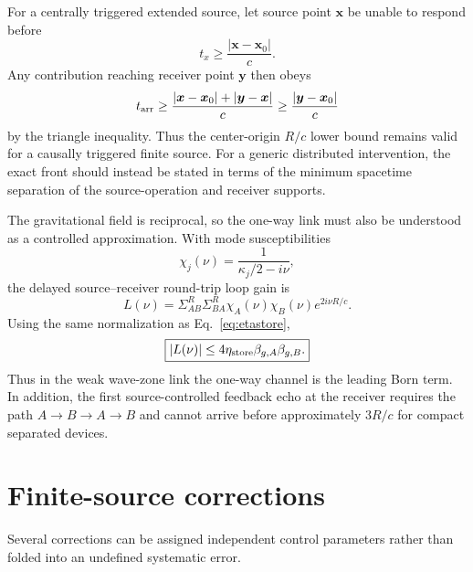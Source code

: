 \documentclass[11pt]{article}
\begin{document}
For a centrally triggered extended source, let source point $\bm x$ be unable to respond before
\begin{equation}
 t_x\ge\frac{|\bm x-\bm x_0|}{c}.
\end{equation}
Any contribution reaching receiver point $\bm y$ then obeys
\begin{equation}
 t_{\rm arr}
\ge
\frac{|\bm x-\bm x_0|+|\bm y-\bm x|}{c}
\ge
\frac{|\bm y-\bm x_0|}{c}
\end{equation}
by the triangle inequality. Thus the center-origin $R/c$ lower bound remains valid for a causally triggered finite source. For a generic distributed intervention, the exact front should instead be stated in terms of the minimum spacetime separation of the source-operation and receiver supports.

The gravitational field is reciprocal, so the one-way link must also be understood as a controlled approximation. With mode susceptibilities
\begin{equation}
\chi_j(\nu)=\frac1{\kappa_j/2-i\nu},
\end{equation}
the delayed source--receiver round-trip loop gain is
\begin{equation}
L(\nu)
=\Sigma_{AB}^R\Sigma_{BA}^R
\chi_A(\nu)\chi_B(\nu)e^{2i\nu R/c}.
\end{equation}
Using the same normalization as Eq.~\eqref{eq:etastore},
\begin{equation}
\boxed{
|L(\nu)|
\le4\eta_{\rm store}\beta_{g,A}\beta_{g,B}.
}
\label{eq:loopbound}
\end{equation}
Thus in the weak wave-zone link the one-way channel is the leading Born term. In addition, the first source-controlled feedback echo at the receiver requires the path $A\to B\to A\to B$ and cannot arrive before approximately $3R/c$ for compact separated devices.

\section{Finite-source corrections}
\label{sec:corrections}

Several corrections can be assigned independent control parameters rather than folded into an undefined systematic error.
\end{document}
